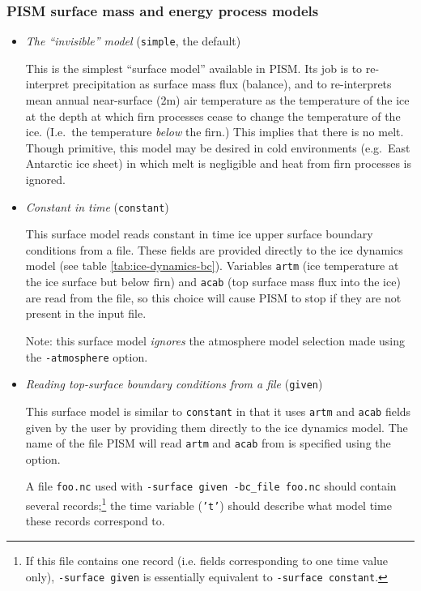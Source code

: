 \subsubsection{PISM surface mass and energy process models}
\label{sec:pism-surface-snow}

\begin{itemize}
  \item \emph{The ``invisible'' model} (\texttt{simple}, the default)

    This is the simplest ``surface model'' available in PISM.  Its job is to re-interpret  precipitation as surface mass flux (balance), and to re-interprets mean annual near-surface (2m) air temperature as the temperature of the ice at the depth at which firn processes cease to change the temperature of the ice.  (I.e.~the temperature \emph{below} the firn.)  This implies that there is no melt.  Though primitive, this model may be desired in cold environments (e.g.~East Antarctic ice sheet) in which melt is negligible and heat from firn processes is ignored.

  \item \emph{Constant in time} (\texttt{constant})

    This surface model reads constant in time ice upper surface boundary conditions from a file.  These fields are provided directly to the ice dynamics model (see table \ref{tab:ice-dynamics-bc}).  Variables \texttt{artm} (ice temperature at the ice surface but below firn) and \texttt{acab} (top surface mass flux into the ice) are read from the file, so this choice will cause PISM to stop if they are not present in the input file.

    Note: this surface model \emph{ignores} the atmosphere model selection made using the \texttt{-atmosphere} option.

  \item \emph{Reading top-surface boundary conditions from a file} (\texttt{given})

    This surface model is similar to \texttt{constant} in that it uses \texttt{artm} and \texttt{acab} fields given by the user by providing them directly to the ice dynamics model. The name of the file PISM will read \texttt{artm} and \texttt{acab} from is specified using the  option.

    A file \texttt{foo.nc} used with \texttt{-surface given -bc_file foo.nc} should contain several records;\footnote{If this file contains one record (i.e. fields corresponding to one time value only), \texttt{-surface given} is essentially equivalent to \texttt{-surface constant}.} the time variable (\texttt{'t'}) should describe what model time these records correspond to.


\end{itemize}
